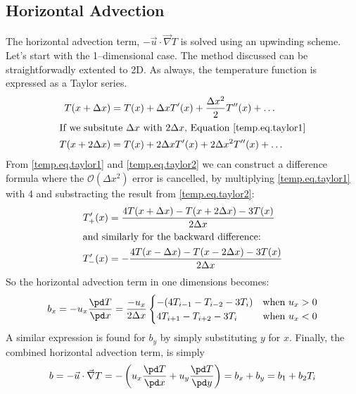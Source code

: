 \subsection{Horizontal Advection}
The horizontal advection term, $- \vec{u}\cdot\vec\nabla T$ is solved using an upwinding scheme. Let's start with the 1--dimensional case. The method discussed can be straightforwadly extented to 2D. As always, the temperature function is expressed as a Taylor series.
\begin{subequations}
  \begin{align}
    \label{temp.eq.taylor1}
    T(x+\Delta x) &=T(x)+\Delta xT'(x)+\frac{\Delta x^2}2T''(x)+\ldots\\
    \intertext{If we subsitute $\Delta x$ with $2\Delta x$, Equation \eqref{temp.eq.taylor1}}
    \label{temp.eq.taylor2}
    T(x+2\Delta x) &=T(x)+2\Delta xT'(x)+2\Delta x^2T''(x)+\ldots
  \end{align}
\end{subequations}
From \eqref{temp.eq.taylor1} and \eqref{temp.eq.taylor2} we can construct a difference formula where the $\mathcal{O}(\Delta x^2)$ error is cancelled, by multiplying \eqref{temp.eq.taylor1} with 4 and substracting the result from \eqref{temp.eq.taylor2}:
\begin{subequations}
  \begin{align}
    \label{temp.eq.forward_h3}
    T_+'(x)&=\frac{4T(x+\Delta x)-T(x+2\Delta x)-3T(x)}{2\Delta x}\\
    \intertext{and similarly for the backward difference:}
    T_-'(x)&=-\frac{4T(x-\Delta x)-T(x-2\Delta x)-3T(x)}{2\Delta x}
    \end{align}
\end{subequations}
So the horizontal advection term in one dimensions becomes:
\begin{equation}
  b_x = -u_x\frac{\pd T}{\pd x}=\frac{-u_x}{2\Delta x}
  \begin{cases}
    -(4T_{i-1}-T_{i-2}-3T_i) & \text{when $u_x>0$} \\
    4T_{i+1}-T_{i+2}-3T_i & \text{when $u_x<0$} \\
  \end{cases}
\end{equation}
A similar expression is found for $b_y$ by simply substituting $y$ for $x$. Finally, the combined horizontal advection term, is simply
\begin{equation}
  b=-\vec{u}\cdot\vec\nabla T=-\left(u_x\frac{\pd T}{\pd x}+u_y\frac{\pd T}{\pd y}\right)=b_x+b_y=b_1+b_2T_i
\end{equation}

